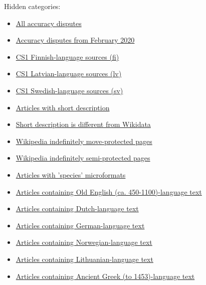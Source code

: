 \documentclass[11pt,a4paper]{article}
\begin{document}
Hidden categories:

\begin{itemize}
\item \href{/wiki/Category:All\_accuracy\_disputes}{All accuracy disputes}
\item \href{/wiki/Category:Accuracy\_disputes\_from\_February\_2020}{Accuracy disputes from February 2020}
\item \href{/wiki/Category:CS1\_Finnish-language\_sources\_\%28fi\%29}{CS1 Finnish-language sources (fi)}
\item \href{/wiki/Category:CS1\_Latvian-language\_sources\_\%28lv\%29}{CS1 Latvian-language sources (lv)}
\item \href{/wiki/Category:CS1\_Swedish-language\_sources\_\%28sv\%29}{CS1 Swedish-language sources (sv)}
\item \href{/wiki/Category:Articles\_with\_short\_description}{Articles with short description}
\item \href{/wiki/Category:Short\_description\_is\_different\_from\_Wikidata}{Short description is different from Wikidata}
\item \href{/wiki/Category:Wikipedia\_indefinitely\_move-protected\_pages}{Wikipedia indefinitely move-protected pages}
\item \href{/wiki/Category:Wikipedia\_indefinitely\_semi-protected\_pages}{Wikipedia indefinitely semi-protected pages}
\item \href{/wiki/Category:Articles\_with\_\%27species\%27\_microformats}{Articles with 'species' microformats}
\item \href{/wiki/Category:Articles\_containing\_Old\_English\_\%28ca.\_450-1100\%29-language\_text}{Articles containing Old English (ca. 450-1100)-language text}
\item \href{/wiki/Category:Articles\_containing\_Dutch-language\_text}{Articles containing Dutch-language text}
\item \href{/wiki/Category:Articles\_containing\_German-language\_text}{Articles containing German-language text}
\item \href{/wiki/Category:Articles\_containing\_Norwegian-language\_text}{Articles containing Norwegian-language text}
\item \href{/wiki/Category:Articles\_containing\_Lithuanian-language\_text}{Articles containing Lithuanian-language text}
\item \href{/wiki/Category:Articles\_containing\_Ancient\_Greek\_\%28to\_1453\%29-language\_text}{Articles containing Ancient Greek (to 1453)-language text}

\end{itemize}
\end{document}
